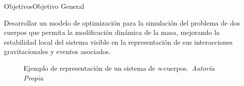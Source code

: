\begin{frame}{Objetivos}{Objetivo General}
    \vspace{-0.15cm}
    \begin{minipage}[c]{0.65\textwidth}
        {\fontsize{8pt}{10pt}\selectfont
        Desarrollar un modelo de optimización para la simulación del problema de dos cuerpos que permita la modificación dinámica de la masa, mejorando la estabilidad local del sistema visible en la representación de sus interacciones gravitacionales y eventos asociados.}
    \end{minipage}
    \hfill
    \begin{minipage}[c]{0.3\textwidth}
        \begin{figure}[H]
            \centering
            \vspace{-0.25cm}
            \caption{\tiny Ejemplo de representación de un sistema de \textit{n}-cuerpos.~\textit{Autoría Propia}}%
            \label{fig:genetic_algorithm_application}
        \end{figure}
    \end{minipage}
\end{frame}


